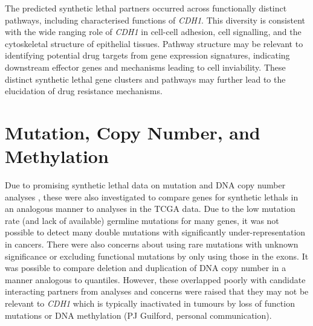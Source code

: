 The predicted \gls{synthetic lethal} partners occurred across functionally distinct \glspl{pathway}, including characterised functions of \textit{CDH1}. This diversity is consistent with the wide ranging role of \textit{CDH1} in cell-cell adhesion, cell signalling, and the cytoskeletal structure of epithelial tissues. Pathway structure may be relevant to identifying potential drug targets from \gls{gene expression} signatures, indicating downstream effector genes and mechanisms leading to cell inviability. These distinct \gls{synthetic lethal} gene clusters and \glspl{pathway} may further lead to the elucidation of drug resistance mechanisms.


\FloatBarrier


\iffalse

\section{Mutation, Copy Number, and Methylation}

Due to promising \gls{synthetic lethal} data on \gls{mutation} and \acrshort{DNA} copy number analyses \citep{Jerby2014, Lu2015}, these were also investigated to compare genes for \glspl{synthetic lethal} in an analogous manner to  analyses in the \gls{TCGA} data. Due to the low  \gls{mutation} rate (and lack of available) \gls{germline} \glspl{mutation} for many genes, it was not possible to detect many double \glspl{mutation} with significantly under-representation in cancers. There were also concerns about using rare \glspl{mutation} with unknown significance or excluding functional \glspl{mutation} by only using those in the exons.
It was possible to compare deletion and duplication of \acrshort{DNA} copy number in a manner analogous to  quantiles. However, these overlapped poorly with candidate interacting partners from  analyses and concerns were raised that they may not be relevant to \textit{CDH1} which is typically inactivated in tumours by loss of function \glspl{mutation} or \acrshort{DNA} methylation (PJ Guilford, personal communication).   

